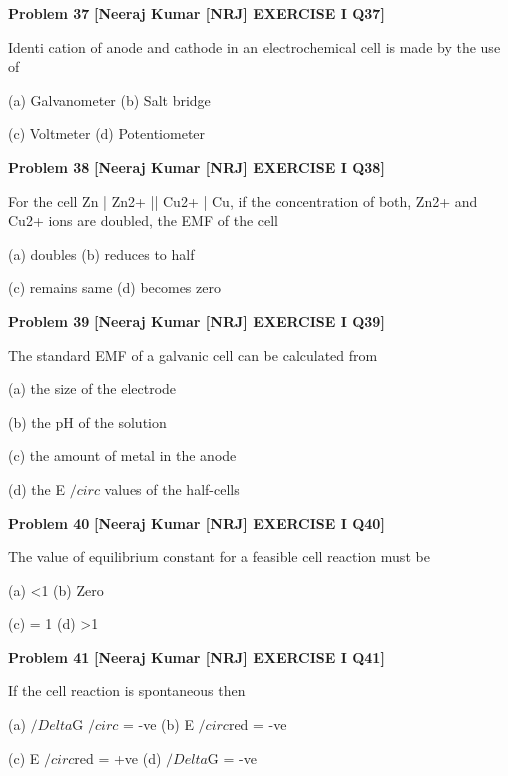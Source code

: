 \begin{problembox}
\textbf{Problem 37} \hfill \textbf{[Neeraj Kumar [NRJ] EXERCISE I Q37]}
\label{q:ext-nrj_all_questions-37}

Identi  cation of anode and cathode in an 
electrochemical cell is made by the use of
 
 (a) Galvanometer 
(b) Salt bridge
 
 (c) Voltmeter 
(d) Potentiometer
\end{problembox}

\begin{problembox}
\textbf{Problem 38} \hfill \textbf{[Neeraj Kumar [NRJ] EXERCISE I Q38]}
\label{q:ext-nrj_all_questions-38}

For the cell Zn | Zn2+ || Cu2+ | Cu, if the concentration 
of both, Zn2+ and Cu2+ ions are doubled, the EMF 
of the cell
 
 (a) doubles 
(b) reduces to half
 
 (c) remains same 
(d) becomes zero
\end{problembox}

\begin{problembox}
\textbf{Problem 39} \hfill \textbf{[Neeraj Kumar [NRJ] EXERCISE I Q39]}
\label{q:ext-nrj_all_questions-39}

The standard EMF of a galvanic cell can be 
calculated from
 
 (a) the size of the electrode
 
 (b) the pH of the solution
 
 (c) the amount of metal in the anode
 
 (d) the E $/circ$ values of the half-cells
\end{problembox}

\begin{problembox}
\textbf{Problem 40} \hfill \textbf{[Neeraj Kumar [NRJ] EXERCISE I Q40]}
\label{q:ext-nrj_all_questions-40}

The value of equilibrium constant for a feasible 
cell reaction must be
 
 (a) <1 
(b) Zero
 
 (c) = 1 
(d) >1
\end{problembox}

\begin{problembox}
\textbf{Problem 41} \hfill \textbf{[Neeraj Kumar [NRJ] EXERCISE I Q41]}
\label{q:ext-nrj_all_questions-41}

If the cell reaction is spontaneous then
 
 (a) $/Delta$G $/circ$ = -ve 
(b) E $/circ$red = -ve
 
 (c) E $/circ$red = +ve 
(d) $/Delta$G = -ve
\end{problembox}

